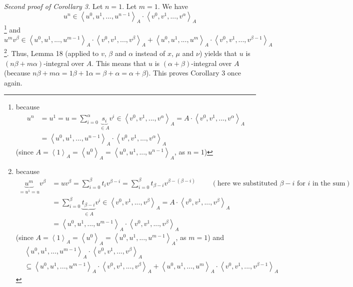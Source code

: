 \documentclass[12pt,final,notitlepage,onecolumn]{article}%
\begin{document}
\textit{Second proof of Corollary 3.} Let $n=1$. Let $m=1$. We have%
\[
u^{n}\in\left\langle u^{0},u^{1},...,u^{n-1}\right\rangle _{A}\cdot
\left\langle v^{0},v^{1},...,v^{\alpha}\right\rangle _{A}%
\]
\footnote{because%
\begin{align*}
u^{n}  &  =u^{1}=u=\sum\limits_{i=0}^{\alpha}\underbrace{s_{i}}_{\in A}%
v^{i}\in\left\langle v^{0},v^{1},...,v^{\alpha}\right\rangle _{A}%
=A\cdot\left\langle v^{0},v^{1},...,v^{\alpha}\right\rangle _{A}\\
&  =\left\langle u^{0},u^{1},...,u^{n-1}\right\rangle _{A}\cdot\left\langle
v^{0},v^{1},...,v^{\alpha}\right\rangle _{A}%
\end{align*}
(since $A=\left\langle 1\right\rangle _{A}=\left\langle u^{0}\right\rangle
_{A}=\left\langle u^{0},u^{1},...,u^{n-1}\right\rangle _{A}$, as $n=1$)} and%
\[
u^{m}v^{\beta}\in\left\langle u^{0},u^{1},...,u^{m-1}\right\rangle _{A}%
\cdot\left\langle v^{0},v^{1},...,v^{\beta}\right\rangle _{A}+\left\langle
u^{0},u^{1},...,u^{m}\right\rangle _{A}\cdot\left\langle v^{0},v^{1}%
,...,v^{\beta-1}\right\rangle _{A}%
\]
\footnote{because%
\begin{align*}
\underbrace{u^{m}}_{=u^{1}=u}v^{\beta}  &  =uv^{\beta}=\sum\limits_{i=0}%
^{\beta}t_{i}v^{\beta-i}=\sum\limits_{i=0}^{\beta}t_{\beta-i}v^{\beta-\left(
\beta-i\right)  }\ \ \ \ \ \ \ \ \ \ \left(  \text{here we substituted }%
\beta-i\text{ for }i\text{ in the sum}\right) \\
&  =\sum\limits_{i=0}^{\beta}\underbrace{t_{\beta-i}}_{\in A}v^{i}%
\in\left\langle v^{0},v^{1},...,v^{\beta}\right\rangle _{A}=A\cdot\left\langle
v^{0},v^{1},...,v^{\beta}\right\rangle _{A}\\
&  =\left\langle u^{0},u^{1},...,u^{m-1}\right\rangle _{A}\cdot\left\langle
v^{0},v^{1},...,v^{\beta}\right\rangle _{A}%
\end{align*}
(since $A=\left\langle 1\right\rangle _{A}=\left\langle u^{0}\right\rangle
_{A}=\left\langle u^{0},u^{1},...,u^{m-1}\right\rangle _{A}$, as $m=1$) and
\begin{align*}
&  \left\langle u^{0},u^{1},...,u^{m-1}\right\rangle _{A}\cdot\left\langle
v^{0},v^{1},...,v^{\beta}\right\rangle _{A}\\
&  \subseteq\left\langle u^{0},u^{1},...,u^{m-1}\right\rangle _{A}%
\cdot\left\langle v^{0},v^{1},...,v^{\beta}\right\rangle _{A}+\left\langle
u^{0},u^{1},...,u^{m}\right\rangle _{A}\cdot\left\langle v^{0},v^{1}%
,...,v^{\beta-1}\right\rangle _{A}%
\end{align*}
}. Thus, Lemma 18 (applied to $v$, $\beta$ and $\alpha$ instead of $x$, $\mu$
and $\nu$) yields that $u$ is $\left(  n\beta+m\alpha\right)  $-integral over
$A$. This means that $u$ is $\left(  \alpha+\beta\right)  $-integral over $A$
(because $n\beta+m\alpha=1\beta+1\alpha=\beta+\alpha=\alpha+\beta$). This
proves Corollary 3 once again.
\end{document}
